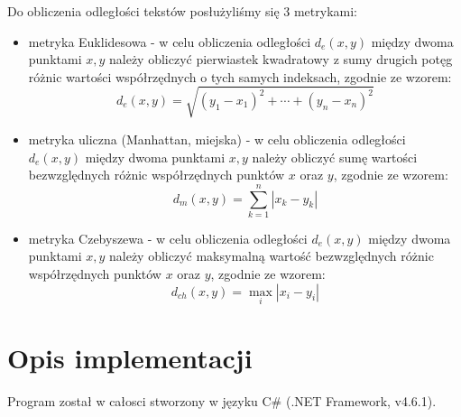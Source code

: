 \documentclass{classrep}
\begin{document}
Do obliczenia odległości tekstów posłużyliśmy się 3 metrykami: \newline

\begin{itemize}[label=$\bullet$]
\item metryka Euklidesowa - w celu obliczenia odległości $ d_{e}(x,y) $ między dwoma punktami $ x, y $ należy obliczyć pierwiastek kwadratowy z sumy drugich potęg różnic wartości współrzędnych o tych samych indeksach, zgodnie ze wzorem:
$$
d_{e}(x,y)= \sqrt{ (y_{1} - x_{1})^2 + \cdots + (y_{n} - x_{n})^2 }
$$

\item metryka uliczna (Manhattan, miejska) - w celu obliczenia odległości $ d_{e}(x,y) $ między dwoma punktami $ x, y $ należy obliczyć sumę wartości bezwzględnych różnic współrzędnych punktów $ x $ oraz $ y $, zgodnie ze wzorem:
$$
d_{m}(x,y)= \sum_{k=1}^{n} | x_{k} - y_{k} |
$$

\item metryka Czebyszewa - w celu obliczenia odległości $ d_{e}(x,y) $ między dwoma punktami $ x, y $ należy obliczyć maksymalną wartość bezwzględnych różnic współrzędnych punktów $ x $ oraz $ y $, zgodnie ze wzorem:
$$
d_{ch}(x,y)= \max_{i} |x_{i} - y_{i}|
$$
\newline
\end{itemize}

\section{Opis implementacji}
Program został w całosci stworzony w języku C\# (.NET Framework, v4.6.1). 
\end{document}
